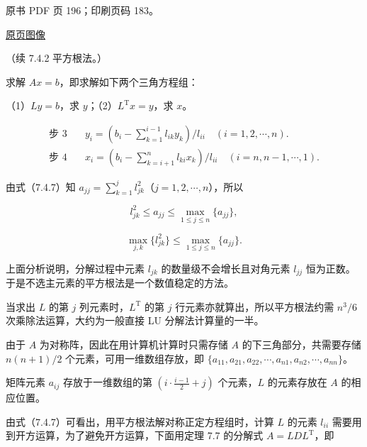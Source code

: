 \clearpage

原书 PDF 页 196；印刷页码 183。

\href{source-images/pdf-196.jpeg}{原页图像}

（续 7.4.2 平方根法。）

求解 \(Ax=b\)，即求解如下两个三角方程组：

（1）\(Ly=b\)，求 \(y\)；（2）\(L^{\mathrm T}x=y\)，求 \(x\)。

\[
\begin{aligned}
\text{步 3}\quad &y_i=\left(b_i-\sum_{k=1}^{i-1}l_{ik}y_k\right)/l_{ii}\quad(i=1,2,\cdots,n).\\
\text{步 4}\quad &x_i=\left(b_i-\sum_{k=i+1}^{n}l_{ki}x_k\right)/l_{ii}\quad(i=n,n-1,\cdots,1).
\end{aligned}
\tag{7.4.8}
\]

由式（7.4.7）知 \(a_{jj}=\sum_{k=1}^{j}l_{jk}^{2}\)（\(j=1,2,\cdots,n\)），所以

\[
l_{jk}^{2}\leqslant a_{jj}\leqslant\max_{1\leqslant j\leqslant n}\{a_{jj}\},
\]

\[
\max_{j,k}\{l_{jk}^{2}\}\leqslant\max_{1\leqslant j\leqslant n}\{a_{jj}\}.
\]

上面分析说明，分解过程中元素 \(l_{jk}\) 的数量级不会增长且对角元素 \(l_{jj}\) 恒为正数。于是不选主元素的平方根法是一个数值稳定的方法。

当求出 \(L\) 的第 \(j\) 列元素时，\(L^{\mathrm T}\) 的第 \(j\) 行元素亦就算出，所以平方根法约需 \(n^3/6\) 次乘除法运算，大约为一般直接 LU 分解法计算量的一半。

由于 \(A\) 为对称阵，因此在用计算机计算时只需存储 \(A\) 的下三角部分，共需要存储 \(n(n+1)/2\) 个元素，可用一维数组存放，即 \(\{a_{11},a_{21},a_{22},\cdots,a_{n1},a_{n2},\cdots,a_{nn}\}\)。

矩阵元素 \(a_{ij}\) 存放于一维数组的第 \(\left(i\cdot\frac{i-1}{2}+j\right)\) 个元素，\(L\) 的元素存放在 \(A\) 的相应位置。

由式（7.4.7）可看出，用平方根法解对称正定方程组时，计算 \(L\) 的元素 \(l_{ii}\) 需要用到开方运算，为了避免开方运算，下面用定理 7.7 的分解式 \(A=LDL^{\mathrm T}\)，即

